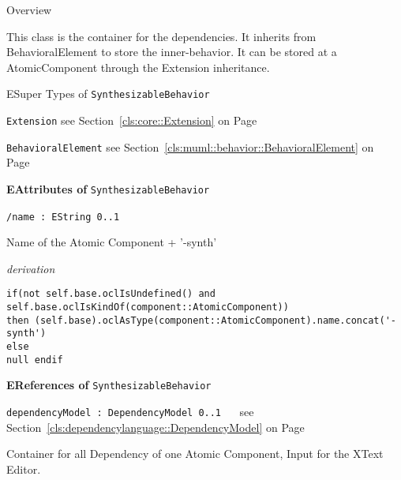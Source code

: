 	\begin{longdescription}
		\item[Overview] 		
				

	

		This class is the container for the dependencies.
It inherits from BehavioralElement to store the inner-behavior.
It can be stored at a AtomicComponent through the Extension inheritance.		
		\item[ESuper Types of \texttt{SynthesizableBehavior}] ~
			\begin{longdescription}
				\item[\texttt{Extension}] see Section~\ref{cls:core::Extension} on Page~\pageref{cls:core::Extension}							\item[\texttt{BehavioralElement}] see Section~\ref{cls:muml::behavior::BehavioralElement} on Page~\pageref{cls:muml::behavior::BehavioralElement}						\end{longdescription}
		
	
			\item[\textbf{EAttributes of} \texttt{SynthesizableBehavior}] ~
			\begin{longdescription}
	\item[\texttt{/name : EString \symbol{"5B}0..1\symbol{"5D}
}] ~
	
	
	\nopagebreak
		
				

	

		 Name of the Atomic Component + '-synth'		
		\begin{longdescription}
	\item[\small\textit{derivation}] ~ 
	\nopagebreak
		\begin{lstlisting}[language=OCL, breaklines=true]
if(not self.base.oclIsUndefined() and self.base.oclIsKindOf(component::AtomicComponent))
then (self.base).oclAsType(component::AtomicComponent).name.concat('-synth')
else
null endif		\end{lstlisting}
		\end{longdescription}
			\end{longdescription}
			\item[\textbf{EReferences of} \texttt{SynthesizableBehavior}] ~
			\begin{longdescription}
	\item[\texttt{dependencyModel : DependencyModel \symbol{"5B}0..1\symbol{"5D}
}] ~
	see Section~\ref{cls:dependencylanguage::DependencyModel} on Page~\pageref{cls:dependencylanguage::DependencyModel}
	
	\nopagebreak
		
				

	

		Container for all Dependency of one Atomic Component, Input for the XText Editor.		
			\end{longdescription}
	
	\end{longdescription}
	


